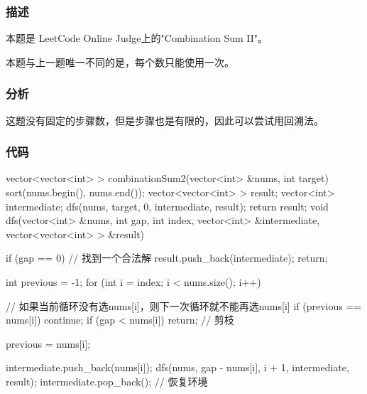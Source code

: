 \subsubsection{描述}
本题是 LeetCode Online Judge上的"Combination Sum II"。

本题与上一题唯一不同的是，每个数只能使用一次。

\subsubsection{分析}
这题没有固定的步骤数，但是步骤也是有限的，因此可以尝试用回溯法。

\subsubsection{代码}
\begin{Codex}[label=combination_sum2.cpp]
    vector<vector<int> > combinationSum2(vector<int> &nums, int target) {
        sort(nums.begin(), nums.end());
        vector<vector<int> > result;
        vector<int> intermediate;
        dfs(nums, target, 0, intermediate, result);
        return result;
    }
    void dfs(vector<int> &nums, int gap, int index,
            vector<int> &intermediate, vector<vector<int> > &result) {
        if (gap == 0) {  //  找到一个合法解
            result.push_back(intermediate);
            return;
        }

        int previous = -1;
        for (int i = index; i < nums.size(); i++) {
            // 如果当前循环没有选nums[i]，则下一次循环就不能再选nums[i]
            if (previous == nums[i])
                continue;
            if (gap < nums[i]) return;  // 剪枝

            previous = nums[i];

            intermediate.push_back(nums[i]);
            dfs(nums, gap - nums[i], i + 1, intermediate, result);
            intermediate.pop_back();  // 恢复环境
        }
    }
\end{Codex}